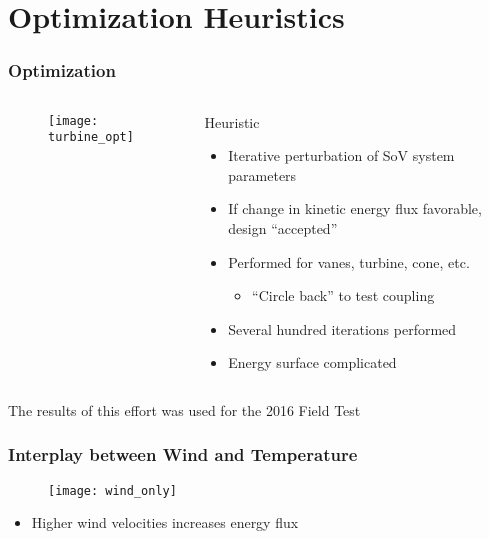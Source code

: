 \documentclass[mathserif]{beamer}
\begin{document}
\section{Optimization Heuristics}
%
%
\begin{frame}
 \frametitle{Optimization}

 \begin{columns}[]
  \begin{column}{0.5\linewidth}

    \begin{figure}[htb]
     \centering
     \texttt{[image: turbine\_opt]}
    \end{figure}

  \end{column}
  \begin{column}{0.5\linewidth}

    \begin{block}{Heuristic}
      \begin{itemize}
       \item Iterative perturbation of SoV system parameters
       \item If change in kinetic energy flux favorable, design ``accepted''
       \item Performed for vanes, turbine, cone, etc. 
	     \begin{itemize}	
	      \item ``Circle back'' to test coupling
	     \end{itemize}
       \item Several hundred iterations performed
       \item Energy surface complicated
      \end{itemize}
    \end{block}

  \end{column}
  \end{columns}

\vspace{5mm}
 \centering
   The results of this effort was used for the 2016 Field Test
 
\end{frame}

%
%
%
\begin{frame}
 \frametitle{Interplay between Wind and Temperature}

 \begin{figure}[htb]
  \centering
  \texttt{[image: wind\_only]}
 \end{figure}

 \begin{itemize}
  \item Higher wind velocities increases energy flux
 \end{itemize}
 
\end{frame}
\end{document}
